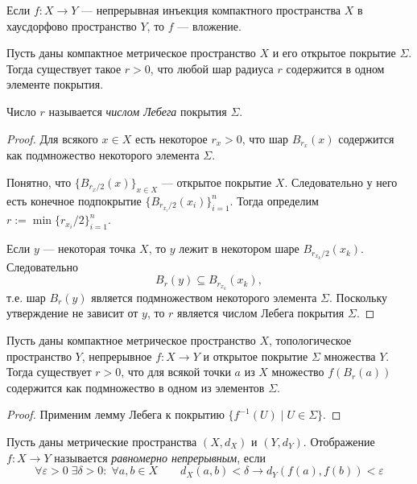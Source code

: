 \documentclass[12pt,a4paper]{article}
\begin{document}
    \begin{corollary}
        Если $f: X \to Y$ --- непрерывная инъекция компактного пространства $X$ в хаусдорфово пространство $Y$, то $f$ --- вложение.
    \end{corollary}

    \begin{lemma}[Лебега]
        Пусть даны компактное метрическое пространство $X$ и его открытое покрытие $\Sigma$. Тогда существует такое $r > 0$, что любой шар радиуса $r$ содержится в одном элементе покрытия.
    \end{lemma}

    \begin{definition}
        Число $r$ называется \emph{числом Лебега} покрытия $\Sigma$.
    \end{definition}

    \begin{proof}
        Для всякого $x \in X$ есть некоторое $r_x > 0$, что шар $B_{r_x}(x)$ содержится как подмножество некоторого элемента $\Sigma$.

        Понятно, что $\{B_{r_x/2}(x)\}_{x \in X}$ --- открытое покрытие $X$. Следовательно у него есть конечное подпокрытие $\{B_{r_{x_i}/2}(x_i)\}_{i=1}^n$. Тогда определим $r := \min \{r_{x_i}/2\}_{i=1}^n$.

        Если $y$ --- некоторая точка $X$, то $y$ лежит в некотором шаре $B_{r_{x_k}/2}(x_k)$. Следовательно
        \[B_r(y) \subseteq B_{r_{x_k}}(x_k),\]
        т.е. шар $B_r(y)$ является подмножеством некоторого элемента $\Sigma$. Поскольку утверждение не зависит от $y$, то $r$ является числом Лебега покрытия $\Sigma$.
    \end{proof}

    \begin{corollary}
        Пусть даны компактное метрическое пространство $X$, топологическое пространство $Y$, непрерывное $f: X \to Y$ и открытое покрытие $\Sigma$ множества $Y$. Тогда существует $r > 0$, что для всякой точки $a$ из $X$ множество $f(B_r(a))$ содержится как подмножество в одном из элементов $\Sigma$.
    \end{corollary}

    \begin{proof}
        Применим лемму Лебега к покрытию $\{f^{-1}(U) \mid U \in \Sigma\}$.
    \end{proof}

    \begin{definition}
        Пусть даны метрические пространства $(X, d_X)$ и $(Y, d_Y)$. Отображение $f: X \to Y$ называется \emph{равномерно непрерывным}, если
        \[\forall \varepsilon > 0\; \exists \delta > 0:\; \forall a, b \in X\qquad d_X(a, b) < \delta \longrightarrow d_Y(f(a), f(b)) < \varepsilon\]
    \end{definition}
\end{document}
